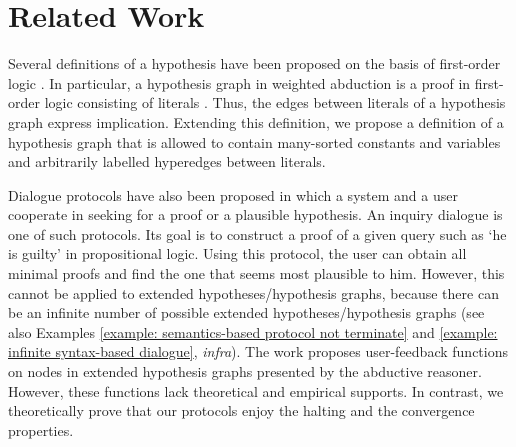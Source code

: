 \section{Related Work}
Several definitions of a hypothesis have been proposed on the basis of first-order logic \cite[Section 2.2]{paul1993approaches}.
In particular, a hypothesis graph in weighted abduction is a proof in first-order logic consisting of literals \cite{stickel1991prolog}.
Thus, the edges between literals of a hypothesis graph express implication.
Extending this definition, we propose a definition of a hypothesis graph that is allowed to contain many-sorted constants and variables and arbitrarily labelled hyperedges between literals.

Dialogue protocols have also been proposed in which a system and a user cooperate in seeking for a proof or a plausible hypothesis.
An inquiry dialogue \cite{black2009inquiry} is one of such protocols. Its goal is to construct a proof of a given query such as `he is guilty' in propositional logic.
Using this protocol, the user can obtain all minimal proofs and find the one that seems most plausible to him.
However, this cannot be applied to extended hypotheses/hypothesis graphs, because there can be an infinite number of possible extended hypotheses/hypothesis graphs (see also Examples \ref{example: semantics-based protocol not terminate} and \ref{example: infinite syntax-based dialogue}, \textit{infra}).
The work \cite{motoura2021cooperative} proposes user-feedback functions on nodes in extended hypothesis graphs presented by the abductive reasoner.
However, these functions lack theoretical and empirical supports. 
In contrast, we theoretically prove that our protocols enjoy the halting and the convergence properties.